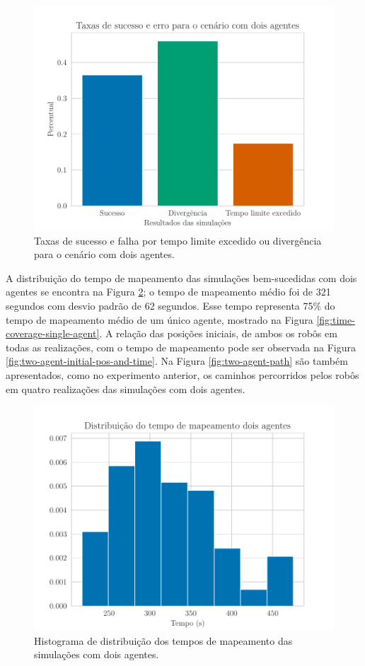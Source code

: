 \begin{figure}
  \centering
  \includegraphics[width=.7\textwidth]{figs/success_rate_bar_two_agents.pdf}
  \caption[Taxas de sucesso e falha para simulações com dois agentes]{Taxas de sucesso e falha por tempo limite excedido ou divergência para o cenário com dois agentes.}
  \label{fig:exp-two-robot-sucess-rate}
\end{figure}

A distribuição do tempo de mapeamento das simulações bem-sucedidas com dois agentes se 
encontra na Figura \ref{fig:time-coverage-two-agents}; o tempo de 
mapeamento médio foi de 321 segundos com desvio padrão de 62 segundos. 
Esse tempo representa 75\% do tempo de mapeamento médio de um único 
agente, mostrado na Figura \ref{fig:time-coverage-single-agent}. A 
relação das posições iniciais, de ambos os robôs em todas as realizações, com o tempo de mapeamento pode ser 
observada na Figura \ref{fig:two-agent-initial-pos-and-time}.  Na Figura \ref{fig:two-agent-path} são também apresentados, como no experimento anterior, 
os caminhos percorridos pelos robôs em quatro realizações das 
simulações com dois agentes.

\begin{figure}
  \centering
  \includegraphics[width=.7\textwidth]{figs/time-coverage_two_agents.pdf}
  \caption[Distribuição do tempo de mapeamento de dois agentes]{Histograma de distribuição dos tempos de mapeamento das simulações com dois agentes.}
  \label{fig:time-coverage-two-agents}
\end{figure}

